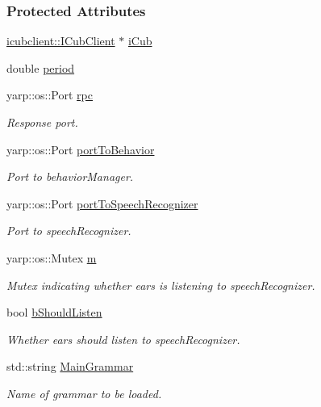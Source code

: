 \subsubsection*{Protected Attributes}
\begin{DoxyCompactItemize}
\item 
\hyperlink{group__icubclient__clients_classicubclient_1_1ICubClient}{icubclient\+::\+I\+Cub\+Client} $\ast$ \hyperlink{group__ears_aab2fe9913cd3b11ba5f35699de54b952}{i\+Cub}
\item 
double \hyperlink{group__ears_a8894096259495df7094cf23907e4b506}{period}
\item 
yarp\+::os\+::\+Port \hyperlink{group__ears_a34c5b9cddeaea5b4c086948017d061fa}{rpc}
\begin{DoxyCompactList}\small\item\em Response port. \end{DoxyCompactList}\item 
yarp\+::os\+::\+Port \hyperlink{group__ears_a75f98651fc0d3b34a0bbb57d24d4e3e9}{port\+To\+Behavior}
\begin{DoxyCompactList}\small\item\em Port to behavior\+Manager. \end{DoxyCompactList}\item 
yarp\+::os\+::\+Port \hyperlink{group__ears_ac467a7a8fdca6c1c9d17f37a5e149e39}{port\+To\+Speech\+Recognizer}
\begin{DoxyCompactList}\small\item\em Port to speech\+Recognizer. \end{DoxyCompactList}\item 
yarp\+::os\+::\+Mutex \hyperlink{group__ears_a76979363a7e9407fda301db649b52b25}{m}
\begin{DoxyCompactList}\small\item\em Mutex indicating whether ears is listening to speech\+Recognizer. \end{DoxyCompactList}\item 
bool \hyperlink{group__ears_a0b3923719b6591be0e03eb63157c5dfb}{b\+Should\+Listen}
\begin{DoxyCompactList}\small\item\em Whether ears should listen to speech\+Recognizer. \end{DoxyCompactList}\item 
std\+::string \hyperlink{group__ears_adffc2dd061350aa8acbe6f52f4ab8feb}{Main\+Grammar}
\begin{DoxyCompactList}\small\item\em Name of grammar to be loaded. \end{DoxyCompactList}\end{DoxyCompactItemize}


